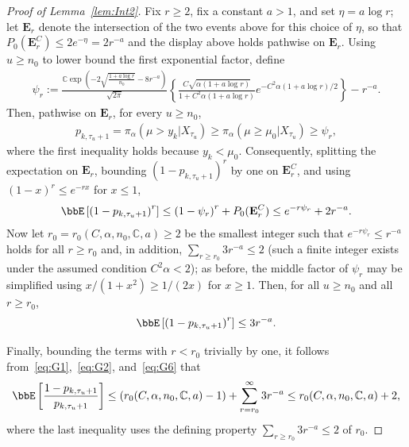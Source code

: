 \documentclass[11pt]{article}
\begin{document}
\begin{proof}[Proof of Lemma~\ref{lem:Int2}]
Fix $r \geq 2$, fix a constant $a > 1$, and set $\eta = a\log r$; let $\mathbf{E}_r$ denote the intersection of the two events above for this choice of $\eta$, so that $P_0(\mathbf{E}_r^C) \leq 2e^{-\eta} = 2r^{-a}$ and the display above holds pathwise on $\mathbf{E}_r$. Using $u \geq n_0$ to lower bound the first exponential factor, define
\begin{align}
    \psi_r := \frac{\mathbb{C}\exp\left(-2\sqrt{\frac{1+a\log r}{n_0}} - 8r^{-a}\right) }{\sqrt{2\pi}}\left\{ \frac{C\sqrt{\alpha (1+a\log r)}}{1+C^2{\alpha (1+a\log r)}}e^{-C^2{\alpha(1+a \log r)/2}}  \right\}-r^{-a}.
    \label{eq:G4}
\end{align}
Then, pathwise on $\mathbf{E}_r$, for every $u \geq n_0$,
\begin{align}
    p_{k,\tau_u+1} = \pi_{\alpha}(\mu > y_k|X_{\tau_u}) \geq \pi_{\alpha}(\mu \geq \mu_0|X_{\tau_u}) \geq \psi_r,
    \nonumber
\end{align}
where the first inequality holds because $y_k < \mu_0$. Consequently, splitting the expectation on $\mathbf{E}_r$, bounding $\left(1-p_{k,\tau_u+1}\right)^{r}$ by one on $\mathbf{E}_r^C$, and using $(1-x)^r \leq e^{-rx}$ for $x \leq 1$,
\begin{align}
    \bbE\left[\left(1-p_{k,\tau_{u}+1}\right)^{r}\right] \leq \left(1-\psi_r\right)^{r} + P_0(\mathbf{E}_r^C) \leq e^{-r \psi_r} + 2r^{-a}.
    \label{eq:G5}
\end{align}
Now let $r_0 = r_0(C,\alpha,n_0,\mathbb{C},a) \geq 2$ be the smallest integer such that $e^{-r\psi_r} \leq r^{-a}$ holds for all $r \geq r_0$ and, in addition, $\sum_{r \geq r_0} 3r^{-a} \leq 2$ (such a finite integer exists under the assumed condition $C^2\alpha < 2$); as before, the middle factor of $\psi_r$ may be simplified using $x/(1+x^2) \geq 1/(2x)$ for $x \geq 1$. Then, for all $u \geq n_0$ and all $r \geq r_0$,
\begin{align}
    \bbE\left[\left(1-p_{k,\tau_{u}+1}\right)^{r}\right] \leq 3r^{-a}.
    \label{eq:G6}
\end{align}

Finally, bounding the terms with $r < r_0$ trivially by one, it follows from~\eqref{eq:G1},~\eqref{eq:G2}, and~\eqref{eq:G6} that
\begin{align}
    \bbE\left[\frac{1-p_{k,\tau_{u}+1}}{p_{k,\tau_{u}+1}}\right] \leq \left(r_0(C,\alpha,n_0,\mathbb{C},a) - 1\right) + \sum_{r=r_0}^{\infty} 3r^{-a} \leq r_0(C,\alpha,n_0,\mathbb{C},a) +2,
\end{align}
where the last inequality uses the defining property $\sum_{r \geq r_0} 3r^{-a} \leq 2$ of $r_0$.
\end{proof}
\end{document}
